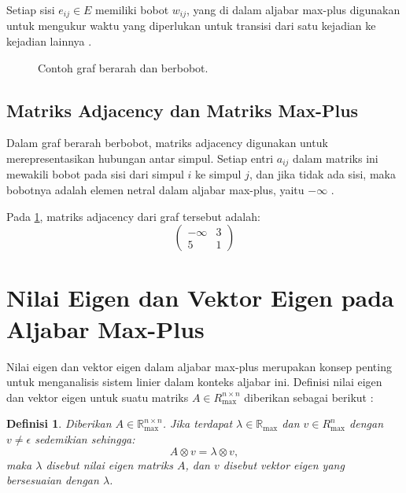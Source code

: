 \documentclass{file/TA-ITS}
\newtheorem{definisi}{Definisi}[section]
\theoremstyle{definition}
\theoremstyle{definition}
\theoremstyle{plain}
\newcommand{\Real}{\mathbb{R}}
\begin{document}
Setiap sisi \( e_{ij} \in E \) memiliki bobot \( w_{ij} \), yang di dalam aljabar max-plus digunakan untuk mengukur waktu yang diperlukan untuk transisi dari satu kejadian ke kejadian lainnya \cite{baccelli}.

\begin{figure}[H]
    \centering
    \caption{Contoh graf berarah dan berbobot.}
    \label{contohgraf}
\end{figure}

\subsection{Matriks Adjacency dan Matriks Max-Plus}

Dalam graf berarah berbobot, matriks adjacency digunakan untuk merepresentasikan hubungan antar simpul. Setiap entri \( a_{ij} \) dalam matriks ini mewakili bobot pada sisi dari simpul \( i \) ke simpul \( j \), dan jika tidak ada sisi, maka bobotnya adalah elemen netral dalam aljabar max-plus, yaitu \( -\infty \) \cite{baccelli}.

Pada \ref{contohgraf}, matriks adjacency dari graf tersebut adalah:
\[
\begin{pmatrix}
    -\infty & 3 \\
    5 & 1
\end{pmatrix}
\]

\section{Nilai Eigen dan Vektor Eigen pada Aljabar Max-Plus}

Nilai eigen dan vektor eigen dalam aljabar max-plus merupakan konsep penting untuk menganalisis sistem linier dalam konteks aljabar ini. Definisi nilai eigen dan vektor eigen untuk suatu matriks \( A \in R_{\max}^{n \times n} \) diberikan sebagai berikut \cite{andro2020}:

\begin{definisi}
Diberikan \( A \in \Real_{\max}^{n \times n} \). Jika terdapat \( \lambda \in \Real_{\max} \) dan \( v \in R_{\max}^n \) dengan \( v \neq \epsilon \) sedemikian sehingga:
\[
A \otimes v = \lambda \otimes v,
\]
maka \( \lambda \) disebut nilai eigen matriks \( A \), dan \( v \) disebut vektor eigen yang bersesuaian dengan \( \lambda \).
\end{definisi}
\end{document}
